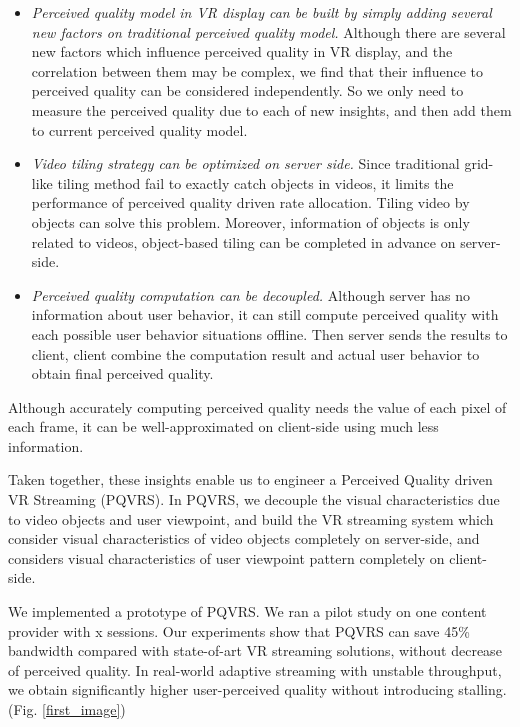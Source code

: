 \begin{itemize}

\item \emph{Perceived quality model in VR display can be built by simply adding several new factors on traditional perceived quality model.} Although there are several new factors which influence perceived quality in VR display, and the correlation between them may be complex, we find that their influence to perceived quality can be considered independently. So we only need to measure the perceived quality due to each of new insights, and then add them to current perceived quality model.

\item \emph{Video tiling strategy can be optimized on server side.} Since traditional grid-like tiling method fail to exactly catch objects in videos, it limits the performance of perceived quality driven rate allocation. Tiling video by objects can solve this problem. Moreover, information of objects is only related to videos, object-based tiling can be completed in advance on server-side.

\item \emph{Perceived quality computation can be decoupled.} Although server has no information about user behavior, it can still compute perceived quality with each possible user behavior situations offline. Then server sends the results to client, client combine the computation result and actual user behavior to obtain final perceived quality.

\end{itemize}

Although accurately computing perceived quality needs the value of each pixel of each frame, it can be well-approximated on client-side using much less information.

Taken together, these insights enable us to engineer a Perceived Quality driven VR Streaming (PQVRS). In PQVRS, we decouple the visual characteristics due to video objects and user viewpoint, and build the VR streaming system which consider visual characteristics of video objects completely on server-side, and considers visual characteristics of user viewpoint pattern completely on client-side.

We implemented a prototype of PQVRS. We ran a pilot study on one content provider with x sessions. Our experiments show that PQVRS can save 45\% bandwidth compared with state-of-art VR streaming solutions, without decrease of perceived quality. In real-world adaptive streaming with unstable throughput, we obtain significantly higher user-perceived quality without introducing stalling. (Fig. \ref{first_image})

